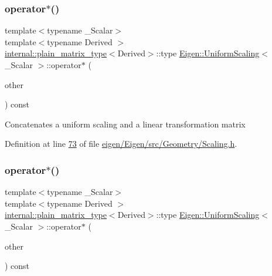 \subsubsection{\texorpdfstring{operator$\ast$()}{operator*()}\hspace{0.1cm}{\footnotesize\ttfamily [7/8]}}
{\footnotesize\ttfamily template$<$typename \+\_\+\+Scalar$>$ \\
template$<$typename Derived $>$ \\
\hyperlink{struct_eigen_1_1internal_1_1plain__matrix__type}{internal\+::plain\+\_\+matrix\+\_\+type}$<$Derived$>$\+::type \hyperlink{class_eigen_1_1_uniform_scaling}{Eigen\+::\+Uniform\+Scaling}$<$ \+\_\+\+Scalar $>$\+::operator$\ast$ (\begin{DoxyParamCaption}\item[{const \hyperlink{group___core___module_class_eigen_1_1_matrix_base}{Matrix\+Base}$<$ Derived $>$ \&}]{other }\end{DoxyParamCaption}) const\hspace{0.3cm}{\ttfamily [inline]}}

Concatenates a uniform scaling and a linear transformation matrix 

Definition at line \hyperlink{eigen_2_eigen_2src_2_geometry_2_scaling_8h_source_l00073}{73} of file \hyperlink{eigen_2_eigen_2src_2_geometry_2_scaling_8h_source}{eigen/\+Eigen/src/\+Geometry/\+Scaling.\+h}.

\mbox{\label{class_eigen_1_1_uniform_scaling_a1caa980503c4bba685aa65b419cad64b}} 
\subsubsection{\texorpdfstring{operator$\ast$()}{operator*()}\hspace{0.1cm}{\footnotesize\ttfamily [8/8]}}
{\footnotesize\ttfamily template$<$typename \+\_\+\+Scalar$>$ \\
template$<$typename Derived $>$ \\
\hyperlink{struct_eigen_1_1internal_1_1plain__matrix__type}{internal\+::plain\+\_\+matrix\+\_\+type}$<$Derived$>$\+::type \hyperlink{class_eigen_1_1_uniform_scaling}{Eigen\+::\+Uniform\+Scaling}$<$ \+\_\+\+Scalar $>$\+::operator$\ast$ (\begin{DoxyParamCaption}\item[{const \hyperlink{group___core___module_class_eigen_1_1_matrix_base}{Matrix\+Base}$<$ Derived $>$ \&}]{other }\end{DoxyParamCaption}) const\hspace{0.3cm}{\ttfamily [inline]}}

